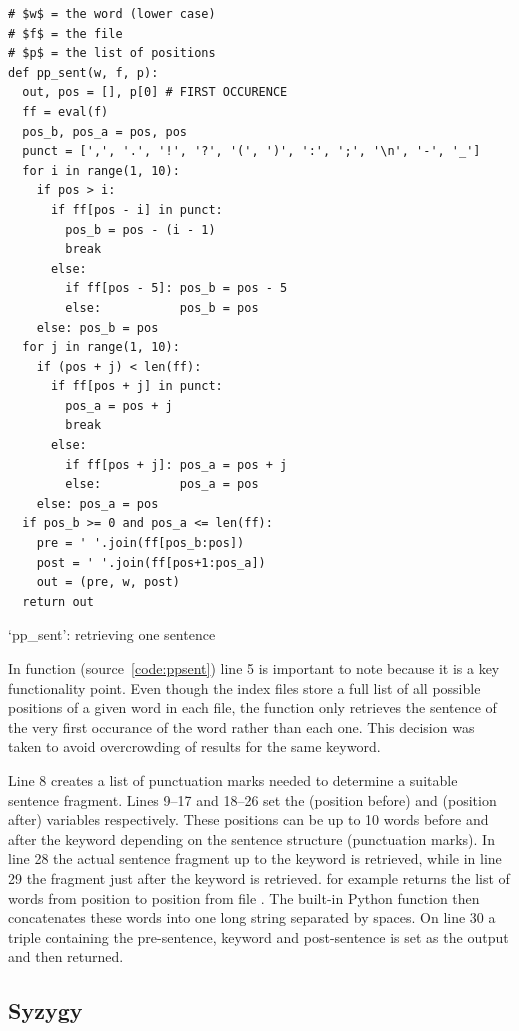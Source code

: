\begin{listing}
  \begin{verbatim}
# $w$ = the word (lower case)
# $f$ = the file
# $p$ = the list of positions
def pp_sent(w, f, p):
  out, pos = [], p[0] # FIRST OCCURENCE
  ff = eval(f)
  pos_b, pos_a = pos, pos
  punct = [',', '.', '!', '?', '(', ')', ':', ';', '\n', '-', '_']
  for i in range(1, 10):
    if pos > i:
      if ff[pos - i] in punct:
        pos_b = pos - (i - 1)
        break
      else:
        if ff[pos - 5]: pos_b = pos - 5
        else:           pos_b = pos
    else: pos_b = pos
  for j in range(1, 10):
    if (pos + j) < len(ff):
      if ff[pos + j] in punct:
        pos_a = pos + j
        break
      else:
        if ff[pos + j]: pos_a = pos + j
        else:           pos_a = pos
    else: pos_a = pos
  if pos_b >= 0 and pos_a <= len(ff):
    pre = ' '.join(ff[pos_b:pos])
    post = ' '.join(ff[pos+1:pos_a])
    out = (pre, w, post)
  return out
  \end{verbatim}
\caption[`pp\_sent' function]{`pp\_sent': retrieving one sentence}
\label{code:ppsent}
\end{listing}

In function  (source~\ref{code:ppsent}) line 5 is important to note because it is a key functionality point. Even though the index files store a full list of all possible positions of a given word in each file, the  function only retrieves the sentence of the very first occurance of the word rather than each one. This decision was taken to avoid overcrowding of results for the same keyword.

Line 8 creates a list of punctuation marks needed to determine a suitable sentence fragment. Lines 9--17 and 18--26 set the  (position before) and  (position after) variables respectively. These positions can be up to 10 words before and after the keyword  depending on the sentence structure (punctuation marks). In line 28 the actual sentence fragment up to the keyword is retrieved, while in line 29 the fragment just after the keyword is retrieved.  for example returns the list of words from position  to position  from file . The built-in Python  function then concatenates these words into one long string separated by spaces. On line 30 a triple containing the pre-sentence, keyword and post-sentence is set as the output and then returned.


\subsection{Syzygy}
\label{s:syzygyalgo}

